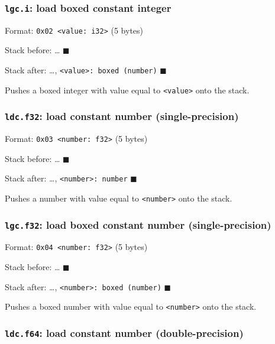 \subsubsection{\texorpdfstring{\texttt{lgc.i}: load boxed constant
integer}{lgc.i: load boxed constant integer}}

Format: \texttt{0x02\ \textless{}value:\ i32\textgreater{}} (5 bytes)

Stack before: \ldots{} \(\blacksquare\)

Stack after: \ldots,
\texttt{\textless{}value\textgreater{}:\ boxed\ (number)}
\(\blacksquare\)

Pushes a boxed integer with value equal to
\texttt{\textless{}value\textgreater{}} onto the stack.

\subsubsection{\texorpdfstring{\texttt{ldc.f32}: load constant number
(single-precision)}{ldc.f32: load constant number (single-precision)}}

Format: \texttt{0x03\ \textless{}number:\ f32\textgreater{}} (5 bytes)

Stack before: \ldots{} \(\blacksquare\)

Stack after: \ldots, \texttt{\textless{}number\textgreater{}:\ number}
\(\blacksquare\)

Pushes a number with value equal to
\texttt{\textless{}number\textgreater{}} onto the stack.

\subsubsection{\texorpdfstring{\texttt{lgc.f32}: load boxed constant
number
(single-precision)}{lgc.f32: load boxed constant number (single-precision)}}

Format: \texttt{0x04\ \textless{}number:\ f32\textgreater{}} (5 bytes)

Stack before: \ldots{} \(\blacksquare\)

Stack after: \ldots,
\texttt{\textless{}number\textgreater{}:\ boxed\ (number)}
\(\blacksquare\)

Pushes a boxed number with value equal to
\texttt{\textless{}number\textgreater{}} onto the stack.

\subsubsection{\texorpdfstring{\texttt{ldc.f64}: load constant number
(double-precision)}{ldc.f64: load constant number (double-precision)}}

